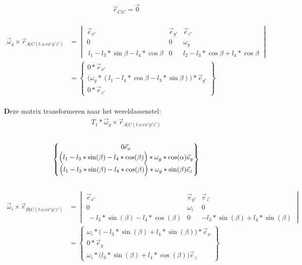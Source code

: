\documentclass[a4paper,10pt]{article}
\begin{document}
\begin{equation}
	\vec{r}_{C|C} = \vec{0}
\end{equation}\\
\begin{equation}
	\begin{aligned}
		\vec{\omega}_g \times \vec{r}_{A|C(t.o.v x'y'z')} & = \begin{vmatrix}
			\vec{e}_{x'}& \vec{e}_{y'} & \vec{e}_{z'}\\
			0 & 0 & \omega_g \\
			\ l_1 - l_3 * \sin{\beta} - l_4*\cos{\beta} & 0 & l_2 - l_3 * \cos{\beta} + l_4 * \cos{\beta}\end{vmatrix}\\
		&= \begin{Bmatrix}
			0 *\vec{e}_{x'}\\
			\Big(\omega_g*(l_1-l_4*\cos{\beta} - l_3 * \sin{\beta})\Big)*\vec{e}_{y'}\\
			0 * \vec{e}_{z'}
		\end{Bmatrix}
	\end{aligned}
\end{equation}\\
\textbf Deze matrix transformeren naar het wereldassenstel:\
\begin{equation}
	\begin{aligned}
		{T}_{1}* \vec{\omega}_g \times \vec{r}_{A|C(t.o.v x'y'z')}
	\end{aligned}
\end{equation}\\
\begin{equation}
	\begin{Bmatrix}
		{0\vec{e}_{x}}\\
		\Big(l_1-l_3*\sin(\beta)-l_4*\cos(\beta)\Big)*\omega_g*\cos(\alpha) \vec{e}_{y}\\
		\Big{(l_1-l_3*\sin(\beta)-l_4*\cos(\beta)\Big)*\omega_g*\sin(\beta)\vec{e}_{z}}
	\end{Bmatrix}
\end{equation}\\
\begin{equation}
	\begin{aligned}
		\vec{\omega}_i \times \vec{r}_{B|C(t.o.v x'y'z')} & = \begin{vmatrix}
			\vec{e}_{x'}& \vec{e}_{y'} & \vec{e}_{z'}\\
			0 & \omega_i & 0 \\
			\  -l_3 * \sin(\beta) - l_4 * \cos(\beta) & 0 &  -l_3*\sin(\beta) + l_4 *\sin(\beta)
		\end{vmatrix}\\
		&= \begin{Bmatrix}
			\omega_i*\Big(-l_3*\sin(\beta) + l_4 *\sin(\beta)\Big) *\vec{e}_{x}\\
			0*\vec{e}_{y}\\
			\omega_i*\Big(l_3 * \sin(\beta) + l_4 * \cos(\beta)\Big) \vec{e}_{z}
		\end{Bmatrix}
	\end{aligned}
\end{equation}\\
\end{document}
